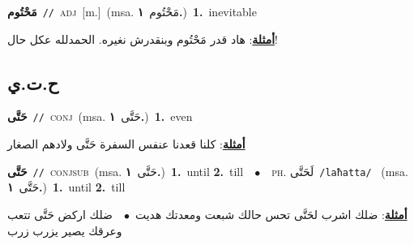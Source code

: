 \documentclass[10pt,a4paper,twoside]{article} %
\begin{document}
\begin{multicols}{2}
{\setlength\topsep{0pt}\textbf{\foreignlanguage{arabic}{مَحْتُوم}}\ {\color{gray}\texttt{//}\color{black}}\ \textsc{adj}\ [m.]\ \color{gray}(msa. \foreignlanguage{arabic}{مَحْتُوم}~\foreignlanguage{arabic}{\textbf{١.}})\color{black}\ \textbf{1.}~inevitable\  \begin{flushright}\color{gray}\foreignlanguage{arabic}{\textbf{\underline{\foreignlanguage{arabic}{أمثلة}}}: هاد قدر مَحْتُوم وبنقدرش نغيره. الحمدلله عكل حال!}\end{flushright}\color{black}} \vspace{2mm}

\vspace{-3mm}
\subsection*{\color{blue}\foreignlanguage{arabic}{ح.ت.ي}\color{blue}{}} 

{\setlength\topsep{0pt}\textbf{\foreignlanguage{arabic}{حَتَّى}}\ {\color{gray}\texttt{//}\color{black}}\ \textsc{conj}\ \color{gray}(msa. \foreignlanguage{arabic}{حَتَّى}~\foreignlanguage{arabic}{\textbf{١.}})\color{black}\ \textbf{1.}~even\  \begin{flushright}\color{gray}\foreignlanguage{arabic}{\textbf{\underline{\foreignlanguage{arabic}{أمثلة}}}: كلنا قعدنا عنفس السفرة حَتَّى ولادهم الصغار}\end{flushright}\color{black}} \vspace{2mm}

{\setlength\topsep{0pt}\textbf{\foreignlanguage{arabic}{حَتَّى}}\ {\color{gray}\texttt{//}\color{black}}\ \textsc{conj\textunderscore sub}\ \color{gray}(msa. \foreignlanguage{arabic}{حَتَّى}~\foreignlanguage{arabic}{\textbf{١.}})\color{black}\ \textbf{1.}~until  \textbf{2.}~till\ \ $\bullet$\ \ \textsc{ph.} \color{gray} \foreignlanguage{arabic}{لَحَتَّى}\color{black}\ {\color{gray}\texttt{/{\sffamily laħatta}/}\color{black}}\ \color{gray} (msa. \foreignlanguage{arabic}{حَتَّى}~\foreignlanguage{arabic}{\textbf{١.}})\color{black}\ \textbf{1.}~until  \textbf{2.}~till\  \begin{flushright}\color{gray}\foreignlanguage{arabic}{\textbf{\underline{\foreignlanguage{arabic}{أمثلة}}}: ضلك اشرب لحَتَّى تحس حالك شبعت ومعدتك هديت\ $\bullet$\ \  ضلك اركض حَتَّى تتعب وعرقك يصير يزرب زرب}\end{flushright}\color{black}} \vspace{2mm}


\end{multicols}
\end{document}
